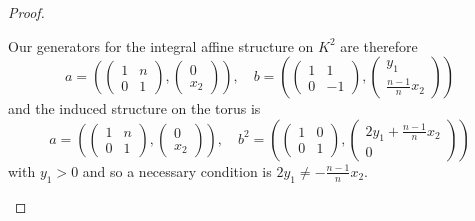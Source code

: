 \begin{proof}
\begin{case}[$A=A_4$, $B=B_2$]
        Our generators for the integral affine structure on $K^2$ are therefore $$ a =
            \left(\begin{pmatrix}
                    1 & n \\
                    0 & 1
                \end{pmatrix} , \begin{pmatrix}
                    0 \\ x_2
                \end{pmatrix}\right), \quad b =\left(\begin{pmatrix}
                    1 & 1  \\
                    0 & -1
                \end{pmatrix} , \begin{pmatrix}
                    y_1 \\ \frac{n-1}{n}x_2
                \end{pmatrix}\right)
        $$
        and the induced structure on the torus is
        $$
            a = \left(\begin{pmatrix}
                    1 & n \\
                    0 & 1
                \end{pmatrix} , \begin{pmatrix}
                    0 \\ x_2
                \end{pmatrix}\right), \quad b^2 =\left(\begin{pmatrix}
                    1 & 0 \\
                    0 & 1
                \end{pmatrix} , \begin{pmatrix}
                    2y_1 + \frac{n-1}{n}x_2 \\ 0
                \end{pmatrix}\right)
        $$
        with $y_1> 0$ and so a necessary condition is $2y_1 \neq -\frac{n-1}{n}x_2$.


\end{case}
\end{proof}
